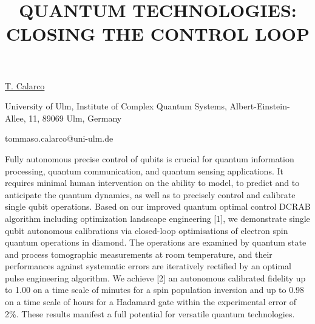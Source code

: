 \title{QUANTUM TECHNOLOGIES: CLOSING THE CONTROL LOOP}

\underline{T. Calarco} 

{\normalsize{\vspace{-4mm}
University of Ulm,
Institute of Complex Quantum Systems,
Albert-Einstein-Allee, 11,
89069 Ulm,
Germany

\email tommaso.calarco@uni-ulm.de}}

Fully autonomous precise control of qubits is crucial for quantum information processing, quantum communication, and quantum sensing applications. It requires minimal human intervention on the ability to model, to predict and to anticipate the quantum dynamics, as well as to precisely control and calibrate single qubit operations. Based on our improved quantum optimal control DCRAB algorithm including optimization landscape engineering [1], we demonstrate single qubit autonomous calibrations via closed-loop optimisations of electron spin quantum operations in diamond. The operations are examined by quantum state and process tomographic measurements at room temperature, and their performances against systematic errors are iteratively rectified by an optimal pulse engineering algorithm. We achieve [2] an autonomous calibrated fidelity up to 1.00 on a time scale of minutes for a spin population inversion and up to 0.98 on a time scale of hours for a Hadamard gate within the experimental error of 2\%. These results manifest a full potential for versatile quantum technologies.

\vspace{\baselineskip}